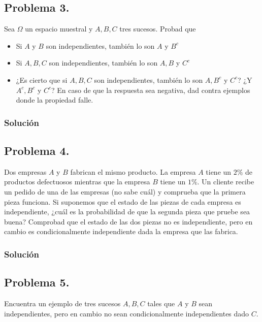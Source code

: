 \documentclass[
]{article}
\providecommand{\tightlist}{%
  \setlength{\itemsep}{0pt}\setlength{\parskip}{0pt}}
\begin{document}
\hypertarget{problema-3.}{%
\subsection{Problema 3.}\label{problema-3.}}

Sea \(\Omega\) un espacio muestral y \(A,B,C\) tres sucesos. Probad que

\begin{itemize}
\tightlist
\item
  Si \(A\) y \(B\) son independientes, también lo son \(A\) y \(B^c\)
\item
  Si \(A,B,C\) son independientes, también lo son \(A,B\) y \(C^c\)
\item
  ¿Es cierto que si \(A,B,C\) son independientes, también lo son
  \(A,B^c\) y \(C^c\)? ¿Y \(A^c, B^c\) y \(C^c\)? En caso de que la
  respuesta sea negativa, dad contra ejemplos donde la propiedad falle.
\end{itemize}

\hypertarget{soluciuxf3n-19}{%
\subsubsection{Solución}\label{soluciuxf3n-19}}

\hypertarget{problema-4.}{%
\subsection{Problema 4.}\label{problema-4.}}

Dos empresas \(A\) y \(B\) fabrican el mismo producto. La empresa \(A\)
tiene un \(2\%\) de productos defectuosos mientras que la empresa \(B\)
tiene un \(1\%\). Un cliente recibe un pedido de una de las empresas (no
sabe cuál) y comprueba que la primera pieza funciona. Si suponemos que
el estado de las piezas de cada empresa es independiente, ¿cuál es la
probabilidad de que la segunda pieza que pruebe sea buena? Comprobad que
el estado de las dos piezas no es independiente, pero en cambio es
condicionalmente independiente dada la empresa que las fabrica.

\hypertarget{soluciuxf3n-20}{%
\subsubsection{Solución}\label{soluciuxf3n-20}}

\hypertarget{problema-5.}{%
\subsection{Problema 5.}\label{problema-5.}}

Encuentra un ejemplo de tres sucesos \(A,B,C\) tales que \(A\) y \(B\)
sean independientes, pero en cambio no sean condicionalmente
independientes dado \(C\).
\end{document}
